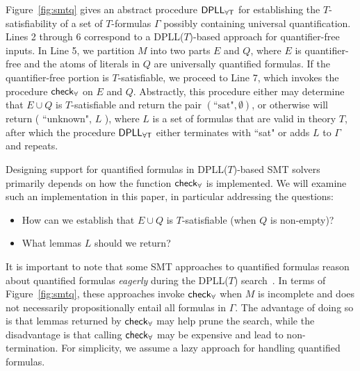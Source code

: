 \documentclass[oribibl]{llncs}
\begin{document}
Figure~\ref{fig:smtq} gives an abstract procedure $\small\mathsf{DPLL_{\forall T}}$
for establishing the $T$-satisfiability of a set of $T$-formulas $\Gamma$ possibly containing universal quantification.
Lines 2 through 6 correspond to a DPLL($T$)-based approach for quantifier-free inputs.
In Line 5, we partition $M$ into two parts $E$ and $Q$,
where $E$ is quantifier-free and the atoms of literals in $Q$ are universally quantified formulas.
If the quantifier-free portion is $T$-satisfiable,
we proceed to Line 7, which invokes the procedure $\small\mathsf{check}_\forall$ on $E$ and $Q$.
Abstractly, this procedure either may determine that $E \cup Q$ is $T$-satisfiable and return the pair $( \text{``sat"}, \emptyset )$,
or otherwise will return ( ``unknown", $L$ ), where $L$ is a set of formulas that are valid in theory $T$,
after which the procedure $\small\mathsf{DPLL_{\forall T}}$ either terminates with ``sat" or adds $L$ to $\Gamma$ and repeats.

Designing support for quantified formulas in DPLL($T$)-based SMT solvers 
primarily depends on how the function $\small\mathsf{check}_\forall$ is implemented.
We will examine such an implementation in this paper, in particular addressing the questions:
\begin{itemize}
\item How can we establish that $E \cup Q$ is $T$-satisfiable (when $Q$ is non-empty)?
\item What lemmas $L$ should we return?
\end{itemize}

It is important to note that some SMT approaches to quantified formulas
reason about quantified formulas \emph{eagerly} during the DPLL($T$) search~\cite{}.
In terms of Figure~\ref{fig:smtq}, these approaches invoke $\small\mathsf{check}_\forall$
when $M$ is incomplete and does not necessarily propositionally entail all formulas in $\Gamma$.
The advantage of doing so is that lemmas returned by $\small\mathsf{check}_\forall$ may help prune the search,
while the disadvantage is that calling $\small\mathsf{check}_\forall$ may be expensive and lead to non-termination.
For simplicity, we assume a lazy approach for handling quantified formulas.
\end{document}
